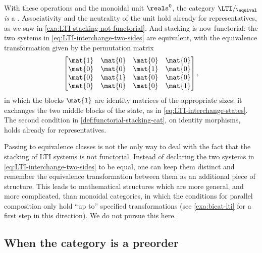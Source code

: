 \begin{example}
    With these operations and the monoidal unit $\reals^0$, the category $\LTI/_{\equival}$ \emph{is} a .
    Associativity and the neutrality of the unit hold already for representatives, as we saw in \cref{exa:LTI-stacking-not-functorial}.
    And stacking is now functorial: the two systems in \cref{eq:LTI-interchange-two-sides} are equivalent, with the equivalence transformation given by the permutation matrix
    \begin{equation}
        \begin{bmatrix}
            \mat{1} & \mat{0} & \mat{0} & \mat{0} \\
            \mat{0} & \mat{0} & \mat{1} & \mat{0} \\
            \mat{0} & \mat{1} & \mat{0} & \mat{0} \\
            \mat{0} & \mat{0} & \mat{0} & \mat{1}
        \end{bmatrix},
    \end{equation}
    in which the blocks $\mat{1}$ are identity matrices of the appropriate sizes; it exchanges the two middle blocks of the state, as in \cref{eq:LTI-interchange-states}.
    The second condition in \cref{def:functorial-stacking-cat}, on identity morphisms, holds already for representatives.
\end{example}

\begin{remark}
    \label{rem:LTI-other-repairs}
    Passing to equivalence classes is not the only way to deal with the fact that the stacking of LTI systems is not functorial.
    Instead of declaring the two systems in \cref{eq:LTI-interchange-two-sides} to be equal, one can keep them distinct and remember the equivalence transformation between them as an additional piece of structure.
    This leads to mathematical structures which are more general, and more complicated, than monoidal categories, in which the conditions for parallel composition only hold ``up to'' specified transformations (see \cref{exa:bicat-lti} for a first step in this direction).
    We do not pursue this here.
\end{remark}






\subsection{When the category is a preorder}
\label{sec:strict-monoidal-preorders}

